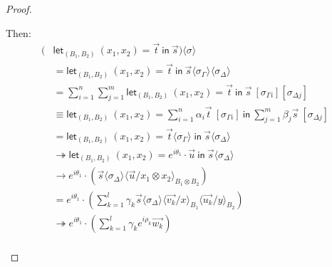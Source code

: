 \documentclass[runningheads,orivec]{llncs}
\newcommand\ansubst[2]{\ensuremath{\langle #1 \rangle_{#2}}}
\def\Pair#1#2{(#1,#2)} %
\def\letkeyword{\mathsf{let}}
\def\inkeyword{\mathsf{in}}
\def\LetP#1#2#3#4#5#6{\letkeyword_{\Pair{#2}{#4}}~\Pair{#1}{#3}=#5~\inkeyword~#6}
\def\evalone{\rightarrow}
\def\eval{\twoheadrightarrow}
\begin{document}
\begin{proof}
\begin{description}
    Then:
    \begin{align*}
        (&\LetP{x_1}{B_1}{x_2}{B_2}{\vec{t}}{\vec{s}})\ansubst{\sigma}{} \\
        &= \LetP{x_1}{B_1}{x_2}{B_2}{\vec{t}}{\vec{s}}\ansubst{\sigma_\Gamma}{}\ansubst{\sigma_\Delta}{}\\
        &=\sum_{i=1}^{n}\sum_{j=1}^{m}\LetP{x_1}{B_1}{x_2}{B_2}{\vec{t}}{\vec{s}}\ [\sigma_{\Gamma i}][\sigma_{\Delta j}]\\
        &\equiv \LetP{x_1}{B_1}{x_2}{B_2}{\sum_{i=1}^{n}\alpha_i\vec{t}\ [\sigma_{\Gamma i}]}{\sum_{j=1}^{m}\beta_j \vec{s}\ [\sigma_{\Delta j}]}\\
        &=\LetP{x_1}{B_1}{x_2}{B_2}{\vec{t}\ansubst{\sigma_\Gamma}{}}{\vec{s}\ansubst{\sigma_\Delta}{}}\\
        &\eval\LetP{x_1}{B_1}{x_2}{B_2}{e^{i\theta_1}\cdot\vec{u}}{\vec{s}\ansubst{\sigma_\Delta}{}}\\
        &\evalone e^{i\theta_1}\cdot(\vec{s}\ansubst{\sigma_\Delta}{}\ansubst{\vec{u}/x_1\otimes x_2}{B_1\otimes B_2})\\
        &=e^{i\theta_1}\cdot(\sum_{k=1}^{l}\gamma_k\vec{s}\ansubst{\sigma_\Delta}{}\ansubst{\vec{v_k}/x}{B_1}\ansubst{\vec{u_k}/y}{B_2})\\
        &\eval e^{i\theta_1}\cdot(\sum_{k=1}^{l}\gamma_k e^{i\rho_k} \vec{w_k})\\
    \end{align*}


\end{description}
\end{proof}
\end{document}

